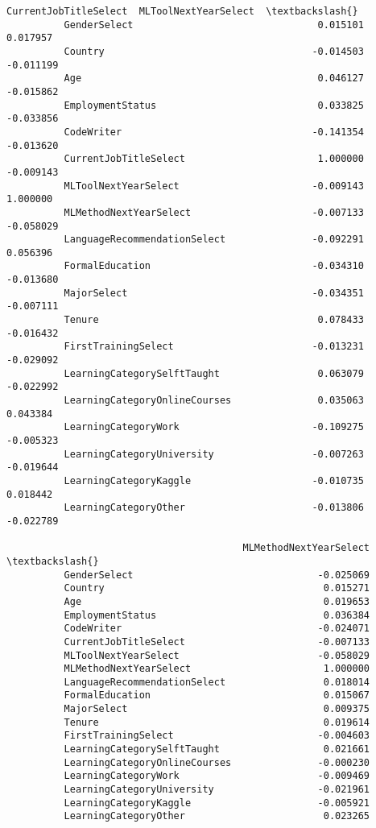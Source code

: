 \documentclass[11pt]{article}
\begin{document}
\begin{Verbatim}[commandchars=\\\{\}]
                                         CurrentJobTitleSelect  MLToolNextYearSelect  \textbackslash{}
          GenderSelect                                0.015101              0.017957   
          Country                                    -0.014503             -0.011199   
          Age                                         0.046127             -0.015862   
          EmploymentStatus                            0.033825             -0.033856   
          CodeWriter                                 -0.141354             -0.013620   
          CurrentJobTitleSelect                       1.000000             -0.009143   
          MLToolNextYearSelect                       -0.009143              1.000000   
          MLMethodNextYearSelect                     -0.007133             -0.058029   
          LanguageRecommendationSelect               -0.092291              0.056396   
          FormalEducation                            -0.034310             -0.013680   
          MajorSelect                                -0.034351             -0.007111   
          Tenure                                      0.078433             -0.016432   
          FirstTrainingSelect                        -0.013231             -0.029092   
          LearningCategorySelftTaught                 0.063079             -0.022992   
          LearningCategoryOnlineCourses               0.035063              0.043384   
          LearningCategoryWork                       -0.109275             -0.005323   
          LearningCategoryUniversity                 -0.007263             -0.019644   
          LearningCategoryKaggle                     -0.010735              0.018442   
          LearningCategoryOther                      -0.013806             -0.022789   
          
                                         MLMethodNextYearSelect  \textbackslash{}
          GenderSelect                                -0.025069   
          Country                                      0.015271   
          Age                                          0.019653   
          EmploymentStatus                             0.036384   
          CodeWriter                                  -0.024071   
          CurrentJobTitleSelect                       -0.007133   
          MLToolNextYearSelect                        -0.058029   
          MLMethodNextYearSelect                       1.000000   
          LanguageRecommendationSelect                 0.018014   
          FormalEducation                              0.015067   
          MajorSelect                                  0.009375   
          Tenure                                       0.019614   
          FirstTrainingSelect                         -0.004603   
          LearningCategorySelftTaught                  0.021661   
          LearningCategoryOnlineCourses               -0.000230   
          LearningCategoryWork                        -0.009469   
          LearningCategoryUniversity                  -0.021961   
          LearningCategoryKaggle                      -0.005921   
          LearningCategoryOther                        0.023265   
          

\end{Verbatim}
\end{document}
